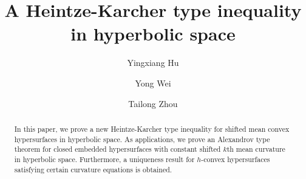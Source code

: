 \documentclass[11pt,reqno]{amsart}
\theoremstyle{definition}
\theoremstyle{remark}
\numberwithin{equation}{section}
\renewcommand{\(}{\left(}
\renewcommand{\)}{\right)}
\renewcommand{\~}{\widetilde}
\renewcommand{\-}{\overline}
\begin{document}
\title[A Heintze-Karcher type inequality in hyperbolic space]{A Heintze-Karcher type inequality in hyperbolic space}
\author[Y. Hu]{Yingxiang Hu}
\address{School of Mathematical Sciences, Beihang University, Beijing 100191, P.R. China}
\author[Y. Wei]{Yong Wei}
\author[T. Zhou]{Tailong Zhou}
\address{School of Mathematical Sciences, University of Science and Technology of China, Hefei 230026, P.R. China}


\begin{abstract}
In this paper, we prove a new Heintze-Karcher type inequality for shifted mean convex hypersurfaces in hyperbolic space. As applications, we prove an Alexandrov type theorem for closed embedded hypersurfaces with constant shifted $k$th mean curvature in hyperbolic space. Furthermore, a uniqueness result for $h$-convex hypersurfaces satisfying certain curvature equations is obtained.
\end{abstract}

\maketitle
\end{document}
